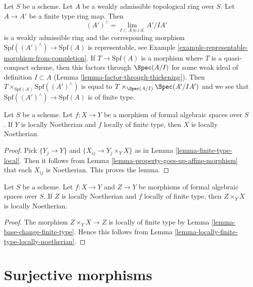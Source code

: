 \begin{example}
\label{example-finite-type-from-finite-type-ring-map}
Let $S$ be a scheme. Let $A$ be a weakly admissible topological ring over $S$.
Let $A \to A'$ be a finite type ring map. Then
$$
(A')^\wedge = \lim_{I \subset A\ w.i.d.} A'/IA'
$$
is a weakly admissible ring and the corresponding morphism
$\text{Spf}((A')^\wedge) \to \text{Spf}(A)$ is representable,
see Example \ref{example-representable-morphism-from-completion}.
If $T \to \text{Spf}(A)$ is a morphism where $T$ is a quasi-compact
scheme, then this factors through $\Spec(A/I)$ for some weak
ideal of definition $I \subset A$ (Lemma \ref{lemma-factor-through-thickening}).
Then $T \times_{\text{Spf}(A)} \text{Spf}((A')^\wedge)$
is equal to $T \times_{\Spec(A/I)} \Spec(A'/IA')$ and
we see that $\text{Spf}((A')^\wedge) \to \text{Spf}(A)$ is
of finite type.
\end{example}

\begin{lemma}
\label{lemma-locally-finite-type-locally-noetherian}
Let $S$ be a scheme. Let $f : X \to Y$ be a morphism of
formal algebraic spaces over $S$. If $Y$ is locally Noetherian and
$f$ locally of finite type, then $X$ is locally Noetherian.
\end{lemma}

\begin{proof}
Pick $\{Y_j \to Y\}$ and $\{X_{ij} \to Y_j \times_Y X\}$
as in Lemma \ref{lemma-finite-type-local}. Then it follows
from Lemma \ref{lemma-property-goes-up-affine-morphism}
that each $X_{ij}$ is Noetherian. This proves the lemma.
\end{proof}

\begin{lemma}
\label{lemma-fibre-product-Noetherian}
Let $S$ be a scheme. Let $f : X \to Y$ and $Z \to Y$ be morphisms
of formal algebraic spaces over $S$. If $Z$ is locally
Noetherian and $f$ locally of finite type, then
$Z \times_Y X$ is locally Noetherian.
\end{lemma}

\begin{proof}
The morphism $Z \times_Y X \to Z$ is locally of finite type by
Lemma \ref{lemma-base-change-finite-type}. Hence this follows
from Lemma \ref{lemma-locally-finite-type-locally-noetherian}.
\end{proof}








\section{Surjective morphisms}
\label{section-surjective}

